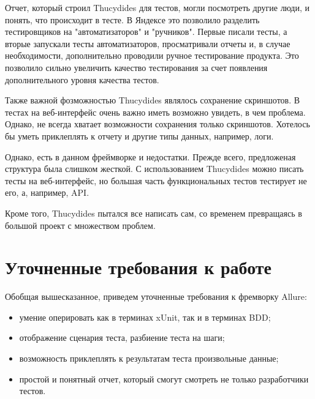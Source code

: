 Отчет, который строил Thucydides для тестов, могли посмотреть другие люди, и понять, что происходит в тесте. В Яндексе это позволило разделить тестировщиков на "автоматизаторов" и "ручников". Первые писали тесты, а вторые запускали тесты автоматизаторов, просматривали отчеты и, в случае необходимости, дополнительно проводили ручное тестирование продукта. Это позволило сильно увеличить качество тестирования за счет появления дополнительного уровня качества тестов.

Также важной фозможностью Thucydides являлось сохранение скриншотов. В тестах на веб-интерфейс очень важно иметь возможно увидеть, в чем проблема. Однако, не всегда хватает возможности сохранения только скриншотов. Хотелось бы уметь приклеплять к отчету и другие типы данных, например, логи.

Однако, есть в данном фреймворке и недостатки. Прежде всего, предложеная структура была слишком жесткой. С использованием Thucydides можно писать тесты на веб-интерфейс, но большая часть функциональных тестов тестирует не его, а, например, API. 

Кроме того, Thucydides пытался все написать сам, со временем превращаясь в большой проект с множеством проблем.

\section{Уточненные требования к работе}

Обобщая вышесказанное, приведем уточненные требования к фремворку Allure:

\begin{itemize}
\item умение оперировать как в терминах xUnit, так и в терминах BDD;
\item отображение сценария теста, разбиение теста на шаги;
\item возможность приклеплять к результатам теста произвольные данные;
\item простой и понятный отчет, который смогут смотреть не только разработчики тестов.
\end{itemize}